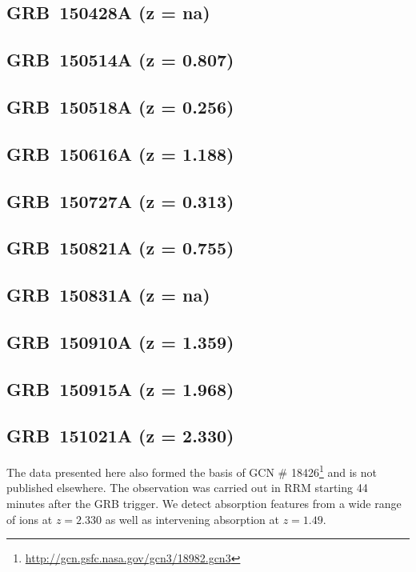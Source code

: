 \documentclass{aa}    %
\begin{document}
\subsection{GRB~150428A (z = na)}	



\subsection{GRB~150514A (z = 0.807)}	



\subsection{GRB~150518A (z = 0.256)}	



\subsection{GRB~150616A (z = 1.188)}	



\subsection{GRB~150727A (z = 0.313)}	



\subsection{GRB~150821A (z = 0.755)}	



\subsection{GRB~150831A (z = na)}	



\subsection{GRB~150910A (z = 1.359)}	



\subsection{GRB~150915A (z = 1.968)}	



\subsection{GRB~151021A (z = 2.330)}
The data presented here also formed the basis of GCN \#
18426\footnote{\url{http://gcn.gsfc.nasa.gov/gcn3/18982.gcn3}} and is not
published elsewhere. The observation was carried out in RRM starting 44 minutes
after the GRB trigger. We detect absorption features from a wide range of ions
at $z=2.330$ as well as intervening absorption at $z=1.49$.
\end{document}
